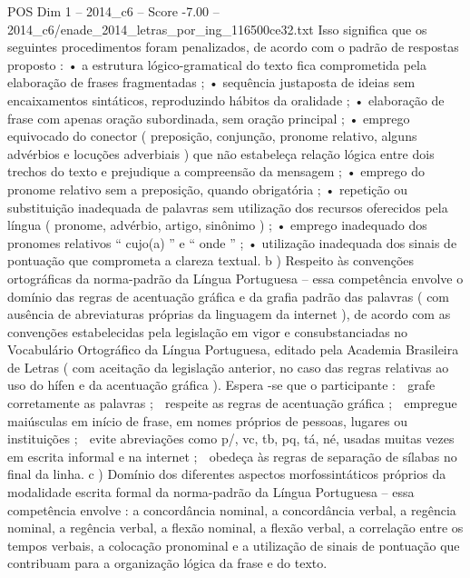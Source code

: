 \begin{textsample}{POS Dim 1 – 2014\_c6 – Score -7.00 – 2014\_c6/enade\_2014\_letras\_por\_ing\_116500ce32.txt}
Isso significa que os seguintes procedimentos foram penalizados, de acordo com o padrão de respostas proposto : • a estrutura lógico-gramatical do texto fica comprometida pela elaboração de frases fragmentadas ; • sequência justaposta de ideias sem encaixamentos sintáticos, reproduzindo hábitos da oralidade ; • elaboração de frase com apenas oração subordinada, sem oração principal ; • emprego equivocado do conector ( preposição, conjunção, pronome relativo, alguns advérbios e locuções adverbiais ) que não estabeleça relação lógica entre dois trechos do texto e prejudique a compreensão da mensagem ; • emprego do pronome relativo sem a preposição, quando obrigatória ; • repetição ou substituição inadequada de palavras sem utilização dos recursos oferecidos pela língua ( pronome, advérbio, artigo, sinônimo ) ; • emprego inadequado dos pronomes relativos “ cujo(a) ” e “ onde ” ; • utilização inadequada dos sinais de pontuação que comprometa a clareza textual. b ) Respeito às convenções ortográficas da norma-padrão da Língua Portuguesa – essa competência envolve o domínio das regras de acentuação gráfica e da grafia padrão das palavras ( com ausência de abreviaturas próprias da linguagem da internet ), de acordo com as convenções estabelecidas pela legislação em vigor e consubstanciadas no Vocabulário Ortográfico da Língua Portuguesa, editado pela Academia Brasileira de Letras ( com aceitação da legislação anterior, no caso das regras relativas ao uso do hífen e da acentuação gráfica ).
Espera -se que o participante :  grafe corretamente as palavras ;  respeite as regras de acentuação gráfica ;  empregue maiúsculas em início de frase, em nomes próprios de pessoas, lugares ou instituições ;  evite abreviações como p/, vc, tb, pq, tá, né, usadas muitas vezes em escrita informal e na internet ;  obedeça às regras de separação de sílabas no final da linha. c ) Domínio dos diferentes aspectos morfossintáticos próprios da modalidade escrita formal da norma-padrão da Língua Portuguesa – essa competência envolve : a concordância nominal, a concordância verbal, a regência nominal, a regência verbal, a flexão nominal, a flexão verbal, a correlação entre os tempos verbais, a colocação pronominal e a utilização de sinais de pontuação que contribuam para a organização lógica da frase e do texto.

\end{textsample}
